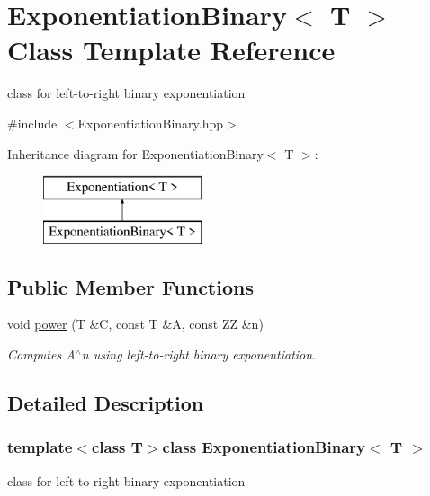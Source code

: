 \hypertarget{classExponentiationBinary}{\section{Exponentiation\-Binary$<$ T $>$ Class Template Reference}
\label{classExponentiationBinary}
}


class for left-\/to-\/right binary exponentiation  




{\ttfamily \#include $<$Exponentiation\-Binary.\-hpp$>$}

Inheritance diagram for Exponentiation\-Binary$<$ T $>$\-:\begin{figure}[H]
\begin{center}
\leavevmode
\includegraphics[height=2.000000cm]{d3/d44/classExponentiationBinary}
\end{center}
\end{figure}
\subsection*{Public Member Functions}
\begin{DoxyCompactItemize}
\item 
void \hyperlink{classExponentiationBinary_ab2743c957571da9b56a8369b1d00a176}{power} (T \&C, const T \&A, const Z\-Z \&n)
\begin{DoxyCompactList}\small\item\em Computes A$^\wedge$n using left-\/to-\/right binary exponentiation. \end{DoxyCompactList}\end{DoxyCompactItemize}


\subsection{Detailed Description}
\subsubsection*{template$<$class T$>$class Exponentiation\-Binary$<$ T $>$}

class for left-\/to-\/right binary exponentiation 

